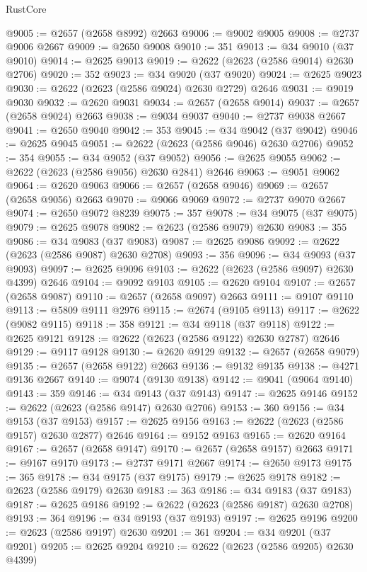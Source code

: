 \begin{lexlean}{RustCore}
\begin{coremodule}
@9005 := @2657 (@2658 @8992) @2663
@9006 := @9002 @9005
@9008 := @2737 @9006 @2667
@9009 := @2650 @9008
@9010 := 351
@9013 := @34 @9010 (@37 @9010)
@9014 := @2625 @9013
@9019 := @2622 (@2623 (@2586 @9014) @2630 @2706)
@9020 := 352
@9023 := @34 @9020 (@37 @9020)
@9024 := @2625 @9023
@9030 := @2622 (@2623 (@2586 @9024) @2630 @2729) @2646
@9031 := @9019 @9030
@9032 := @2620 @9031
@9034 := @2657 (@2658 @9014)
@9037 := @2657 (@2658 @9024) @2663
@9038 := @9034 @9037
@9040 := @2737 @9038 @2667
@9041 := @2650 @9040
@9042 := 353
@9045 := @34 @9042 (@37 @9042)
@9046 := @2625 @9045
@9051 := @2622 (@2623 (@2586 @9046) @2630 @2706)
@9052 := 354
@9055 := @34 @9052 (@37 @9052)
@9056 := @2625 @9055
@9062 := @2622 (@2623 (@2586 @9056) @2630 @2841) @2646
@9063 := @9051 @9062
@9064 := @2620 @9063
@9066 := @2657 (@2658 @9046)
@9069 := @2657 (@2658 @9056) @2663
@9070 := @9066 @9069
@9072 := @2737 @9070 @2667
@9074 := @2650 @9072 @8239
@9075 := 357
@9078 := @34 @9075 (@37 @9075)
@9079 := @2625 @9078
@9082 := @2623 (@2586 @9079) @2630
@9083 := 355
@9086 := @34 @9083 (@37 @9083)
@9087 := @2625 @9086
@9092 := @2622 (@2623 (@2586 @9087) @2630 @2708)
@9093 := 356
@9096 := @34 @9093 (@37 @9093)
@9097 := @2625 @9096
@9103 := @2622 (@2623 (@2586 @9097) @2630 @4399) @2646
@9104 := @9092 @9103
@9105 := @2620 @9104
@9107 := @2657 (@2658 @9087)
@9110 := @2657 (@2658 @9097) @2663
@9111 := @9107 @9110
@9113 := @5809 @9111 @2976
@9115 := @2674 (@9105 @9113)
@9117 := @2622 (@9082 @9115)
@9118 := 358
@9121 := @34 @9118 (@37 @9118)
@9122 := @2625 @9121
@9128 := @2622 (@2623 (@2586 @9122) @2630 @2787) @2646
@9129 := @9117 @9128
@9130 := @2620 @9129
@9132 := @2657 (@2658 @9079)
@9135 := @2657 (@2658 @9122) @2663
@9136 := @9132 @9135
@9138 := @4271 @9136 @2667
@9140 := @9074 (@9130 @9138)
@9142 := @9041 (@9064 @9140)
@9143 := 359
@9146 := @34 @9143 (@37 @9143)
@9147 := @2625 @9146
@9152 := @2622 (@2623 (@2586 @9147) @2630 @2706)
@9153 := 360
@9156 := @34 @9153 (@37 @9153)
@9157 := @2625 @9156
@9163 := @2622 (@2623 (@2586 @9157) @2630 @2877) @2646
@9164 := @9152 @9163
@9165 := @2620 @9164
@9167 := @2657 (@2658 @9147)
@9170 := @2657 (@2658 @9157) @2663
@9171 := @9167 @9170
@9173 := @2737 @9171 @2667
@9174 := @2650 @9173
@9175 := 365
@9178 := @34 @9175 (@37 @9175)
@9179 := @2625 @9178
@9182 := @2623 (@2586 @9179) @2630
@9183 := 363
@9186 := @34 @9183 (@37 @9183)
@9187 := @2625 @9186
@9192 := @2622 (@2623 (@2586 @9187) @2630 @2708)
@9193 := 364
@9196 := @34 @9193 (@37 @9193)
@9197 := @2625 @9196
@9200 := @2623 (@2586 @9197) @2630
@9201 := 361
@9204 := @34 @9201 (@37 @9201)
@9205 := @2625 @9204
@9210 := @2622 (@2623 (@2586 @9205) @2630 @4399)

\end{coremodule}
\end{lexlean}
